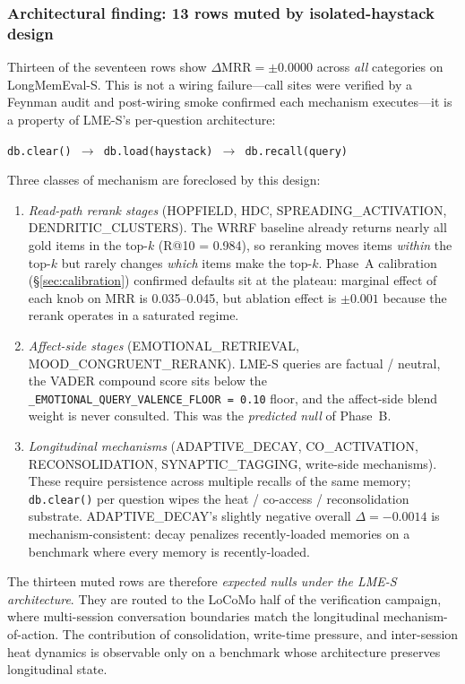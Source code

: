 \documentclass[11pt]{article}
\begin{document}
\subsubsection{Architectural finding: 13 rows muted by isolated-haystack design}
\label{sec:per-mech-architectural}

Thirteen of the seventeen rows show $\Delta\text{MRR} = \pm 0.0000$
across \emph{all} categories on LongMemEval-S.  This is not a wiring
failure---call sites were verified by a Feynman audit and post-wiring
smoke confirmed each mechanism executes---it is a property of LME-S's
per-question architecture:
\begin{center}
\texttt{db.clear() $\to$ db.load(haystack) $\to$ db.recall(query)}
\end{center}

Three classes of mechanism are foreclosed by this design:

\begin{enumerate}
\item \emph{Read-path rerank stages} (HOPFIELD, HDC,
  SPREADING\_ACTIVATION, DENDRITIC\_CLUSTERS).  The WRRF baseline
  already returns nearly all gold items in the top-$k$
  (R@10 = 0.984), so reranking moves items \emph{within} the top-$k$
  but rarely changes \emph{which} items make the top-$k$.  Phase~A
  calibration (\S\ref{sec:calibration}) confirmed defaults sit at
  the plateau: marginal effect of each knob on MRR is
  0.035--0.045, but ablation effect is $\pm 0.001$ because the
  rerank operates in a saturated regime.
\item \emph{Affect-side stages} (EMOTIONAL\_RETRIEVAL,
  MOOD\_CONGRUENT\_RERANK).  LME-S queries are factual / neutral,
  the VADER compound score sits below the
  \texttt{\_EMOTIONAL\_QUERY\_VALENCE\_FLOOR = 0.10} floor, and the
  affect-side blend weight is never consulted.  This was the
  \emph{predicted null} of Phase~B.
\item \emph{Longitudinal mechanisms} (ADAPTIVE\_DECAY,
  CO\_ACTIVATION, RECONSOLIDATION, SYNAPTIC\_TAGGING, write-side
  mechanisms).  These require persistence across multiple recalls of
  the same memory; \texttt{db.clear()} per question wipes the heat /
  co-access / reconsolidation substrate.  ADAPTIVE\_DECAY's slightly
  negative overall $\Delta = -0.0014$ is mechanism-consistent: decay
  penalizes recently-loaded memories on a benchmark where every
  memory is recently-loaded.
\end{enumerate}

The thirteen muted rows are therefore \emph{expected nulls under the
LME-S architecture}.  They are routed to the LoCoMo half of the
verification campaign, where multi-session conversation boundaries
match the longitudinal mechanism-of-action.  The contribution of
consolidation, write-time pressure, and inter-session heat dynamics
is observable only on a benchmark whose architecture preserves
longitudinal state.
\end{document}
